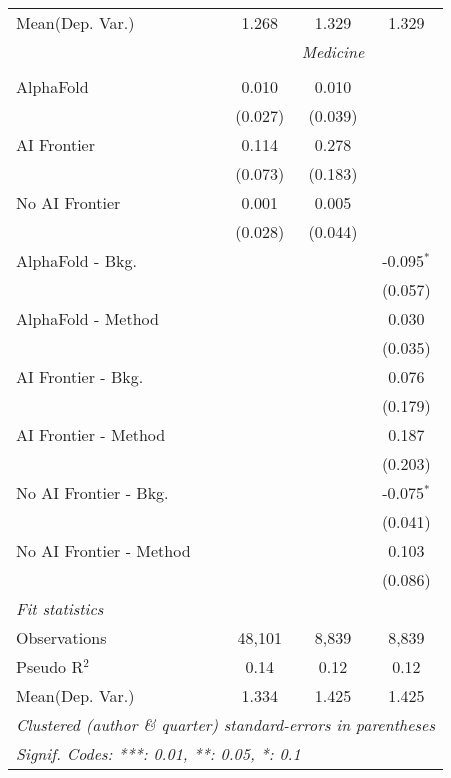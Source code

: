 \begin{tabular}{lccc}
Mean(Dep. Var.) & 1.268 & 1.329 & 1.329 \\
 & \multicolumn{3}{c}{\textit{Medicine}} \\ \\
   AlphaFold               & 0.010   & 0.010   &   \\   
                           & (0.027) & (0.039) &   \\   
   AI Frontier             & 0.114   & 0.278   &   \\   
                           & (0.073) & (0.183) &   \\   
   No AI Frontier          & 0.001   & 0.005   &   \\   
                           & (0.028) & (0.044) &   \\   
   AlphaFold - Bkg.        &         &         & -0.095$^{*}$\\   
                           &         &         & (0.057)\\   
   AlphaFold - Method      &         &         & 0.030\\   
                           &         &         & (0.035)\\   
   AI Frontier - Bkg.      &         &         & 0.076\\   
                           &         &         & (0.179)\\   
   AI Frontier - Method    &         &         & 0.187\\   
                           &         &         & (0.203)\\   
   No AI Frontier - Bkg.   &         &         & -0.075$^{*}$\\   
                           &         &         & (0.041)\\   
   No AI Frontier - Method &         &         & 0.103\\   
                           &         &         & (0.086)\\   
   \midrule
   \emph{Fit statistics}\\
   Observations            & 48,101  & 8,839   & 8,839\\  
   Pseudo R$^2$            & 0.14    & 0.12    & 0.12\\  
Mean(Dep. Var.) & 1.334 & 1.425 & 1.425 \\
   \midrule \midrule
   \multicolumn{4}{l}{\emph{Clustered (author \& quarter) standard-errors in parentheses}}\\
   \multicolumn{4}{l}{\emph{Signif. Codes: ***: 0.01, **: 0.05, *: 0.1}}\\
\end{tabular}
\par\endgroup
